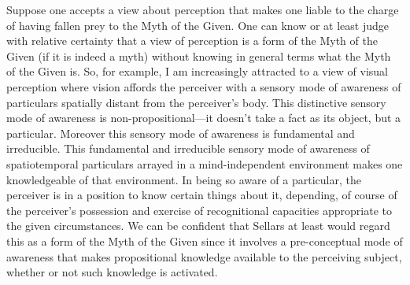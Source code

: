 \documentclass[12pt]{article}
\begin{document}
Suppose one accepts a view about perception that makes one liable to the charge of having fallen prey to the Myth of the Given. One can know or at least judge with relative certainty that a view of perception is a form of the Myth of the Given (if it is indeed a myth) without knowing in general terms what the Myth of the Given is. So, for example, I am increasingly attracted to a view of visual perception where vision affords the perceiver with a sensory mode of awareness of particulars spatially distant from the perceiver's body. This distinctive sensory mode of awareness is non-propositional---it doesn't take a fact as its object, but a particular. Moreover this sensory mode of awareness is fundamental and irreducible. This fundamental and irreducible sensory mode of awareness of spatiotemporal particulars arrayed in a mind-independent environment makes one knowledgeable of that environment. In being so aware of a particular, the perceiver is in a position to know certain things about it, depending, of course of the perceiver's possession and exercise of recognitional capacities appropriate to the given circumstances. We can be confident that Sellars at least would regard this as a form of the Myth of the Given since it involves a pre-conceptual mode of awareness that makes propositional knowledge available to the perceiving subject, whether or not such knowledge is activated.



 
 
\end{document}
